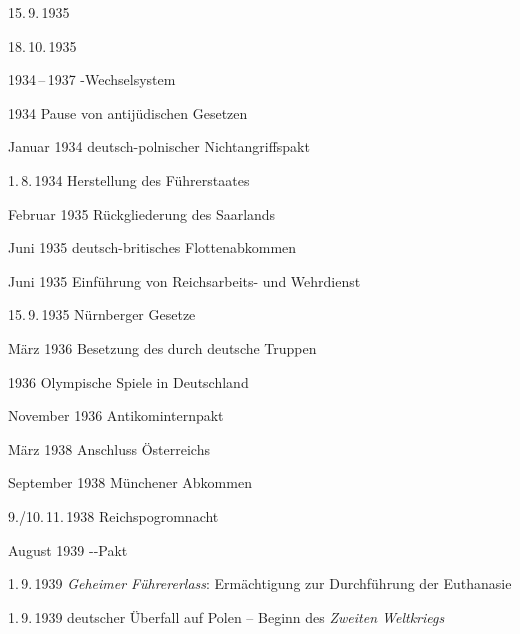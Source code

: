 \begin{chronik}
\item[15.\,9.\,1935]

\item[18.\,10.\,1935]

\item[1934\,--\,1937]
-Wechselsystem

\item[1934]
Pause von antijüdischen Gesetzen

\item[Januar 1934]
deutsch-polnischer Nichtangriffspakt

\item[1.\,8.\,1934]
Herstellung des Führerstaates

\item[Februar 1935]
Rückgliederung des Saarlands

\item[Juni 1935]
deutsch-britisches Flottenabkommen

\item[Juni 1935]
Einführung von Reichsarbeits- und Wehrdienst

\item[15.\,9.\,1935]
Nürnberger Gesetze

\item[März 1936]
Besetzung des  durch deutsche Truppen

\item[1936]
Olympische Spiele in Deutschland

\item[November 1936]
Antikominternpakt

\item[März 1938]
Anschluss Österreichs

\item[September 1938]
Münchener Abkommen

\item[9./10.\,11.\,1938]
Reichspogromnacht

\item[August 1939]
--Pakt

\item[1.\,9.\,1939]
\emph{Geheimer Führererlass}: Ermächtigung zur Durchführung der
Euthanasie

\item[1.\,9.\,1939]
deutscher Überfall auf Polen -- Beginn des \emph{Zweiten Weltkriegs}


\end{chronik}
